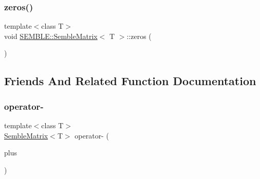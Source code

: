 \subsubsection{\texorpdfstring{zeros()}{zeros()}\hspace{0.1cm}{\footnotesize\ttfamily [2/2]}}
{\footnotesize\ttfamily template$<$class T$>$ \\
void \mbox{\hyperlink{structSEMBLE_1_1SembleMatrix}{S\+E\+M\+B\+L\+E\+::\+Semble\+Matrix}}$<$ T $>$\+::zeros (\begin{DoxyParamCaption}\item[{void}]{ }\end{DoxyParamCaption})}



\subsection{Friends And Related Function Documentation}
\mbox{\label{structSEMBLE_1_1SembleMatrix_a821dd2813fe3a716f33e5498a31745b9}} 
\subsubsection{\texorpdfstring{operator-\/}{operator-}\hspace{0.1cm}{\footnotesize\ttfamily [1/2]}}
{\footnotesize\ttfamily template$<$class T$>$ \\
\mbox{\hyperlink{structSEMBLE_1_1SembleMatrix}{Semble\+Matrix}}$<$T$>$ operator-\/ (\begin{DoxyParamCaption}\item[{const \mbox{\hyperlink{structSEMBLE_1_1SembleMatrix}{Semble\+Matrix}}$<$ T $>$ \&}]{plus }\end{DoxyParamCaption})\hspace{0.3cm}{\ttfamily [friend]}}

\mbox{\label{structSEMBLE_1_1SembleMatrix_a821dd2813fe3a716f33e5498a31745b9}} 
